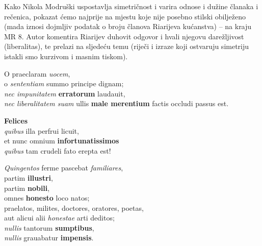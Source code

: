 \documentclass[a5paper,twoside]{article}
\renewenvironment{quote}
               {\list{}{\rightmargin 0mm
                \leftmargin 7mm
                \itemindent 0em}%
                \item\relax}
               {\endlist}
\begin{document}
Kako Nikola Modruški uspostavlja simetričnost i varira odnose i dužine članaka i rečenica, pokazat ćemo najprije na mjestu koje nije posebno stilski obilježeno (mada iznosi dojmljiv podatak o broju članova Riarijeva kućanstva) – na kraju MR 8. Autor komentira Riarijev duhovit odgovor i hvali njegovu darežljivost (liberalitas), te prelazi na sljedeću temu (riječi i izraze koji ostvaruju simetriju istakli smo kurzivom i masnim tiskom).

\begin{quote}
\begin{latin}

O praeclaram \textit{uocem}, \\
o \textit{sententiam} summo principe dignam; \\
\textit{nec impunitatem} \textbf{erratorum} laudauit, \\
\textit{nec liberalitatem suam} ullis \textbf{male merentium} factis occludi passus est.


\textbf{Felices}\\ 
\textit{quibus} illa perfrui licuit, \\
et nunc omnium \textbf{infortunatissimos} \\
\textit{quibus} tam crudeli fato erepta est! 

\textit{Quingentos} ferme pascebat \textit{familiares}, \\
partim \textbf{illustri}, \\
partim \textbf{nobili}, \\
omnes \textbf{honesto} loco natos; \\
praelatos, milites, doctores, oratores, poetas, \\
aut alicui alii \textit{honestae} arti deditos; \\
\textit{nullis} tantorum \textbf{sumptibus}, \\
\textit{nullis} grauabatur \textbf{impensis}. 

\end{latin}
\end{quote}
\end{document}
